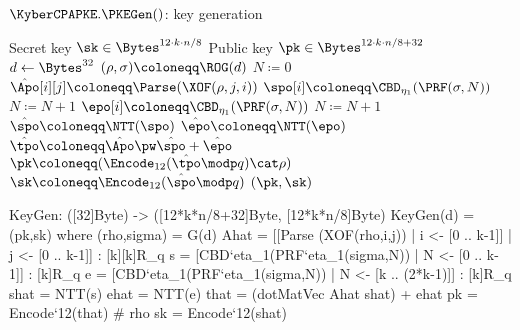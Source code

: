 \begin{algorithm}
  \caption{$\KyberCPAPKE.\PKEGen()$: key generation
  \label{kybercpa-gen}}
  \begin{algorithmic}[1]
    \Ensure Secret key $\sk \in \Bytes^{12\cdot k\cdot n/8}$
    \Ensure Public key $\pk \in \Bytes^{12\cdot k\cdot n/8 + 32}$
    \State $d \gets \Bytes^{32}$                  \label{line:secretrandomness}
    \State $(\rho, \sigma) \coloneqq \ROG(d)$ 
    \State $N \coloneqq 0$
               
      \State $\hat{\Apo}[i][j] \coloneqq \Parse(\XOF(\rho, j, i))$
    \EndFor
    \EndFor
               
    \State $\spo[i] \coloneqq \CBD_{\eta_1}(\PRF(\sigma, N))$
    \State $N \coloneqq N+1$
    \EndFor
               
    \State $\epo[i] \coloneqq \CBD_{\eta_1}(\PRF(\sigma, N))$
    \State $N \coloneqq N+1$
    \EndFor
    \State $\hat{\spo} \coloneqq \NTT(\spo)$\label{line:kybercpa-gen:ntts}
    \State $\hat{\epo} \coloneqq \NTT(\epo)$
    \State $\hat{\tpo} \coloneqq \hat{\Apo} \pw \hat{\spo} + \hat{\epo}$\label{line:kybercpa-gen:invnttas}
    \State $\pk \coloneqq (\Encode_{12}(\hat{\tpo} \modp q)\cat\rho)$\Comment{$\pk \coloneqq \Apo\spo + \epo$}
    \State $\sk \coloneqq \Encode_{12}(\hat{\spo} \modp q)$\Comment{$\sk \coloneqq \spo$}
    \State \Return $(\pk, \sk)$
  \end{algorithmic}
\end{algorithm}

\begin{code}
  KeyGen: ([32]Byte) -> ([12*k*n/8+32]Byte, [12*k*n/8]Byte)
  KeyGen(d) = (pk,sk) where
    (rho,sigma) = G(d)
    Ahat = [[Parse (XOF(rho,i,j)) | i <- [0 .. k-1]] | j <- [0 .. k-1]] : [k][k]R_q
    s = [CBD`{eta_1}(PRF`{eta_1}(sigma,N)) | N <- [0 .. k-1]] : [k]R_q
    e = [CBD`{eta_1}(PRF`{eta_1}(sigma,N)) | N <- [k .. (2*k-1)]] : [k]R_q
    shat = NTT(s)
    ehat = NTT(e)
    that = (dotMatVec Ahat shat) + ehat
    pk = Encode`{12}(that) # rho
    sk = Encode`{12}(shat)
\end{code}

